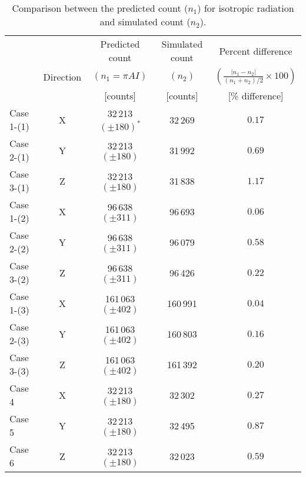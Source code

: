\documentclass{jkas}
\begin{document}
\begin{table*}[t!]
\caption{Comparison between the predicted count ($n_1$) for isotropic radiation and simulated count ($n_2$).\label{tab:tab1}}
\centering
\begin{tabular}{lcccc}
\toprule
 & & Predicted count & Simulated count & Percent difference \\
 & Direction & $(n_1 = \pi AI)$ & $(n_2)$ & $\left( \frac{|n_1-n_2|}{(n_1+n_2)/2}\times 100 \right)$ \\
 & & [counts] & [counts] & [\% difference] \\
\midrule
Case 1-(1) & X & 32\,213 $(\pm 180)^{*}$ & 32\,269 & $0.17$ \\
Case 2-(1) & Y & 32\,213 $(\pm 180)$ & 31\,992 & $0.69$ \\
Case 3-(1) & Z & 32\,213 $(\pm 180)$ & 31\,838 & $1.17$ \\
Case 1-(2) & X & 96\,638 $(\pm 311)$ & 96\,693 & $0.06$ \\
Case 2-(2) & Y & 96\,638 $(\pm 311)$ & 96\,079 & $0.58$ \\
Case 3-(2) & Z & 96\,638 $(\pm 311)$ & 96\,426 & $0.22$ \\
Case 1-(3) & X & 161\,063 $(\pm 402)$ & 160\,991 & $0.04$ \\
Case 2-(3) & Y & 161\,063 $(\pm 402)$ & 160\,803 & $0.16$ \\
Case 3-(3) & Z & 161\,063 $(\pm 402)$ & 161\,392 & $0.20$ \\
Case 4 & X & 32\,213 $(\pm 180)$ & 32\,302 & $0.27$ \\
Case 5 & Y & 32\,213 $(\pm 180)$ & 32\,495 & $0.87$ \\
Case 6 & Z & 32\,213 $(\pm 180)$ & 32\,023 & $0.59$ \\
\bottomrule
\end{tabular}
\end{table*}
\end{document}
